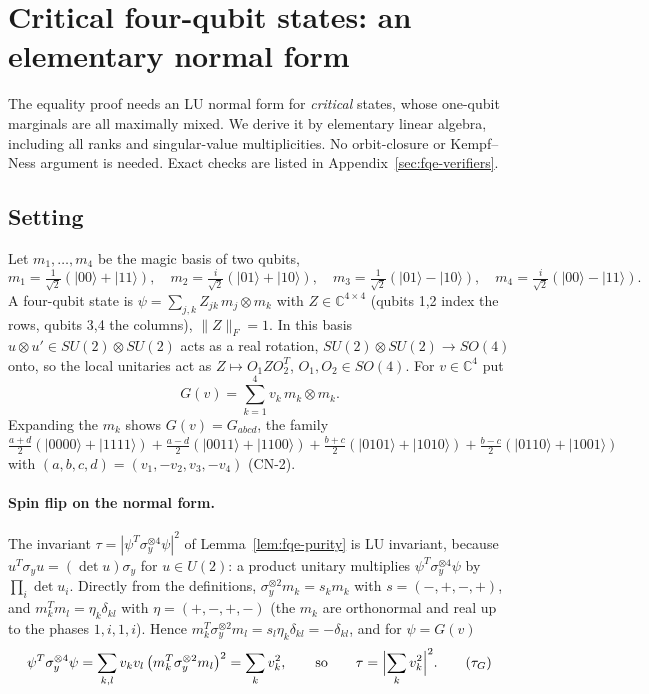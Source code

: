 \section{Critical four-qubit states: an elementary normal form}\label{sec:fqe-normal-form}

The equality proof needs an LU normal form for \emph{critical} states, whose one-qubit marginals are all
maximally mixed. We derive it by elementary linear algebra, including all ranks and singular-value multiplicities. No orbit-closure or Kempf--Ness argument is needed. Exact checks are listed in Appendix~\ref{sec:fqe-verifiers}.

\subsection{Setting}\label{sec:fqe-critical_four_qubit_normal_form-setting}

Let \(m_1,\dots,m_4\) be the magic basis of two qubits, \[
m_1=\tfrac1{\sqrt2}(\lvert00\rangle+\lvert11\rangle),\quad
m_2=\tfrac{i}{\sqrt2}(\lvert01\rangle+\lvert10\rangle),\quad
m_3=\tfrac1{\sqrt2}(\lvert01\rangle-\lvert10\rangle),\quad
m_4=\tfrac{i}{\sqrt2}(\lvert00\rangle-\lvert11\rangle).
\] A four-qubit state is \(\psi=\sum_{j,k}Z_{jk}\,m_j\otimes m_k\) with \(Z\in\mathbb C^{4\times4}\)
(qubits 1,2 index the rows, qubits 3,4 the columns), \(\|Z\|_F=1\). In this basis \(u\otimes u'\in
SU(2)\otimes SU(2)\) acts as a real rotation, \(SU(2)\otimes SU(2)\to SO(4)\) onto, so the local
unitaries act as \(Z\mapsto O_1ZO_2^{T}\), \(O_1,O_2\in SO(4)\). For \(v\in\mathbb C^4\) put \[
G(v)=\sum_{k=1}^4v_k\,m_k\otimes m_k .
\] Expanding the \(m_k\) shows \(G(v)=G_{abcd}\), the family
\(\tfrac{a+d}2(\lvert0000\rangle+\lvert1111\rangle)+\tfrac{a-d}2(\lvert0011\rangle+\lvert1100\rangle)+\tfrac{b+c}2(\lvert0101\rangle+\lvert1010\rangle)+\tfrac{b-c}2(\lvert0110\rangle+\lvert1001\rangle)\)
with \((a,b,c,d)=(v_1,-v_2,v_3,-v_4)\) (CN-2).

\paragraph{Spin flip on the normal form.} The invariant \(\tau=|\psi^T\sigma_y^{\otimes4}\psi|^2\) of
Lemma~\ref{lem:fqe-purity} is LU invariant, because \(u^T\sigma_yu=(\det u)\sigma_y\) for
\(u\in U(2)\): a product unitary multiplies \(\psi^T\sigma_y^{\otimes4}\psi\) by
\(\prod_i\det u_i\). Directly from the definitions, \(\sigma_y^{\otimes2}m_k=s_km_k\) with
\(s=(-,+,-,+)\), and \(m_k^Tm_l=\eta_k\delta_{kl}\) with \(\eta=(+,-,+,-)\) (the \(m_k\) are
orthonormal and real up to the phases \(1,i,1,i\)). Hence
\(m_k^T\sigma_y^{\otimes2}m_l=s_l\eta_k\delta_{kl}=-\delta_{kl}\), and for \(\psi=G(v)\)
\[
\psi^T\sigma_y^{\otimes4}\psi=\sum_{k,l}v_kv_l\,\bigl(m_k^T\sigma_y^{\otimes2}m_l\bigr)^2=\sum_kv_k^2,
\qquad\text{so}\qquad \tau=\Bigl|\sum_kv_k^2\Bigr|^2. \tag{$\tau_G$}\label{eq:fqe-spin-flip-normal-form}
\]

